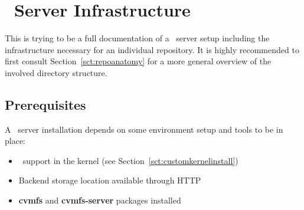 \chapter{\cvmfs\ Server Infrastructure}
\label{apx:serverinfrastructure}

This is trying to be a full documentation of a \cvmfs\ server setup including the infrastructure necessary for an individual repository.
It is highly recommended to first consult Section~\ref{sct:repoanatomy} for a more general overview of the involved directory structure.

\section{Prerequisites}
A \cvmfs\ server installation depends on some environment setup and tools to be in place:
\begin{itemize}
\item \aufs\ support in the kernel (see Section~\ref{sct:customkernelinstall})
\item Backend storage location available through HTTP
\item \textbf{cvmfs} and \textbf{cvmfs-server} packages installed
\end{itemize}
